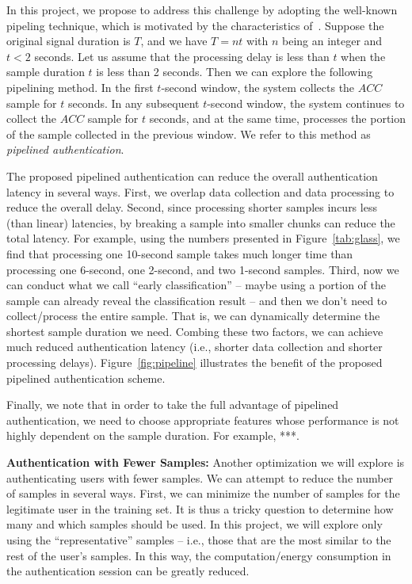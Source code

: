 In this project, we propose to address this challenge by adopting the well-known pipeling technique, which is motivated by the characteristics of~\systemname. Suppose the original signal duration is $T$, and we have $T=nt$ with $n$ being an integer and $t<2$ seconds. Let us assume that the processing delay is less than $t$ when the sample duration $t$ is less than 2 seconds.  Then we can explore the following pipelining method. In the first $t$-second window, the system collects the $ACC$ sample for $t$ seconds. In any subsequent $t$-second window, the system continues to collect the $ACC$ sample for $t$ seconds, and at the same time, processes the portion of the sample collected in the previous window. We refer to this method as \emph{pipelined authentication}.


The proposed pipelined authentication can reduce the overall authentication latency in several ways. First, we overlap data collection and data processing to reduce the overall delay. Second, since processing shorter samples incurs less (than linear) latencies, by breaking a sample into smaller chunks can reduce the total latency. For example, using the numbers presented in Figure~\ref{tab:glass}, we find that processing one 10-second sample takes much longer time than processing one 6-second, one 2-second, and two 1-second samples. Third, now we can conduct what we call ``early classification'' -- maybe using a portion of the sample can already reveal the classification result -- and then we don't need to collect/process the entire sample. That is, we can dynamically determine the shortest sample duration we need. Combing these two factors, we can achieve much reduced authentication latency (i.e., shorter data collection and shorter processing delays). Figure~\ref{fig:pipeline} illustrates the benefit of the proposed pipelined authentication scheme.

Finally, we note that in order to take the full advantage of pipelined authentication, we need to choose appropriate features whose performance is not highly dependent on the sample duration. For example, ***.


\vspace{4pt}\textbf{Authentication with Fewer Samples:} Another optimization we will explore is authenticating users with fewer samples. We can attempt to reduce the number of samples in several ways. First, we can minimize the number of samples for the legitimate user in the training set. It is thus a tricky question to determine how many and which samples should be used. In this project, we will explore only using the ``representative'' samples -- i.e., those that are the most similar to the rest of the user's samples. In this way, the computation/energy consumption in the authentication session can be greatly reduced.

